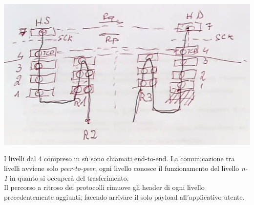 \documentclass[11pt, oneside]{article}   	%
\begin{document}
\begin{center}
\includegraphics[scale=0.7]{req}
\end{center}
I livelli dal 4 compreso in sù sono chiamati end-to-end. La comunicazione tra livelli avviene solo \emph{peer-to-peer}, ogni livello conosce il funzionamento del livello \emph{n-1} in quanto si occuperà del trasferimento.\\
Il percorso a ritroso dei protocolli rimuove gli header di ogni livello precedentemente aggiunti, facendo arrivare il solo payload all'applicativo utente.\\\\
\end{document}

